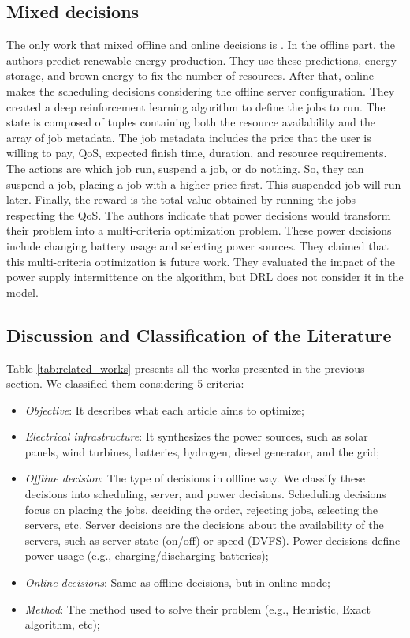 \subsection{Mixed decisions}

The only work that mixed offline and online decisions is \cite{venkataswamy2023rare}. In the offline part, the authors predict renewable energy production. They use these predictions, energy storage, and brown energy to fix the number of resources. After that, online makes the scheduling decisions considering the offline server configuration. They created a deep reinforcement learning algorithm to define the jobs to run. The state is composed of tuples containing both the resource availability and the array of job metadata. The job metadata includes the price that the user is willing to pay, QoS, expected finish time, duration, and resource requirements. The actions are which job run, suspend a job, or do nothing. So, they can suspend a job, placing a job with a higher price first. This suspended job will run later. Finally, the reward is the total value obtained by running the jobs respecting the QoS. The authors indicate that power decisions would transform their problem into a multi-criteria optimization problem. These power decisions include changing battery usage and selecting power sources. They claimed that this multi-criteria optimization is future work. They evaluated the impact of the power supply intermittence on the algorithm, but DRL does not consider it in the model.

\subsection{Discussion and Classification of the Literature}
Table \ref{tab:related_works} presents all the works presented in the previous section. We classified them considering 5 criteria:

\begin{itemize}
    \item \textit{Objective}: It describes what each article aims to optimize;
    \item \textit{Electrical infrastructure}: It synthesizes the power sources, such as solar panels, wind turbines, batteries, hydrogen, diesel generator, and the grid;
    \item \textit{Offline decision}: The type of decisions in offline way. We classify these decisions into scheduling, server, and power decisions. Scheduling decisions focus on placing the jobs, deciding the order, rejecting jobs, selecting the servers, etc. Server decisions are the decisions about the availability of the servers, such as server state (on/off) or speed (DVFS). Power decisions define power usage (e.g., charging/discharging batteries);
    \item \textit{Online decisions}: Same as offline decisions, but in online mode;
    \item \textit{Method}: The method used to solve their problem (e.g., Heuristic, Exact algorithm, etc);
\end{itemize}

